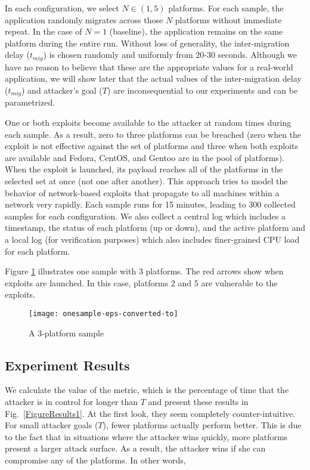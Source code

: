 \documentclass{acm_proc_article-sp}
\begin{document}
In each configuration, we select $N\in(1,5)$ platforms. For each sample, the application randomly migrates across those $N$ platforms without immediate repeat. In the case of $N = 1$ (baseline), the application remains on the same platform during the entire run. Without loss of generality, the inter-migration delay ($t_{mig}$) is chosen randomly and uniformly from 20-30 seconds. Although we have no reason to believe that these are the appropriate values for a real-world application, we will show later that the actual values
of the inter-migration delay ($t_{mig}$) and attacker's goal ($T$) are inconsequential to our experiments and can be parametrized. 

One or both exploits become available to the attacker at random times during each sample. As a result, zero to three platforms can be breached (zero when the exploit is not effective against the set of platforms and three when both exploits are available and Fedora, CentOS, and Gentoo are in the pool of platforms). When the exploit is launched, its payload reaches all of the platforms in the selected set at once (not one after another). This approach tries to model the behavior of network-based exploits that propagate to all machines within a network very rapidly. Each sample runs for 15 minutes, leading to 300 collected samples for each configuration. We also collect a central log which includes a timestamp, the status of each platform (up or down), and the active platform and a local log (for verification purposes) which also includes finer-grained CPU load for each platform. 

Figure \ref{FigureSample} illustrates one sample with 3 platforms. The red arrows show when exploits are launched. In this case, platforms
2 and 5 are vulnerable to the exploits.

\begin{figure}
\begin{centering}
\texttt{[image: onesample-eps-converted-to]}
\caption{A 3-platform sample}
\label{FigureSample}
\end{centering}
\end{figure}

\subsection{Experiment Results}
\label{SS:ExperimentalResults}
We calculate the value of the metric, which is the percentage of time that the attacker is in control for longer than $T$ and present these results in Fig.~\ref{FigureResults1}.  At the first look, they seem completely counter-intuitive. For small attacker goals ($T$), fewer platforms actually perform better. This is due to the fact that in situations where the attacker wins quickly, more platforms present a larger attack surface. As a result, the attacker wins if she can compromise any of the platforms. In other words,
\end{document}
